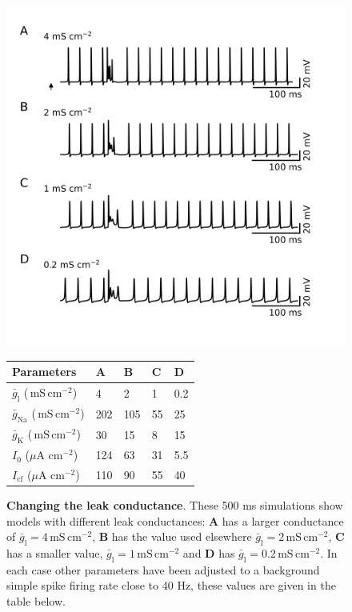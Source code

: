 \documentclass[twocolumn]{svjour3}          %
\newcommand{\msi}{\,\mathrm{mS\,cm^{-2}}}
\renewcommand{\k}{\mathrm{K}}
\newcommand{\na}{\mathrm{Na}}
\newcommand{\leak}{\mathrm{l}}
\begin{document}
\begin{figure}[!ht]
\includegraphics[width=\linewidth]{figure_gl_3.jpg}
\caption{\textbf{Changing the leak conductance}. These 500 ms simulations show models
  with different leak conductances: \textbf{A} has a larger
  conductance of $\bar{g}_\leak=4\msi$, \textbf{B} has the value used
  elsewhere $\bar{g}_\leak=2\msi$, \textbf{C} has a smaller value,
  $\bar{g}_\leak=1\msi$ and \textbf{D} has $\bar{g}_\leak=0.2\msi$. In
  each case other parameters have been adjusted to a background simple
  spike firing rate close to 40 Hz, these values are given in the
  table below.}
  \begin{center}
    \begin{tabular}{|l l l l l|}
      \hline
      Parameters &  \textbf{A} & \textbf{B} & \textbf{C} & \textbf{D}\\ \hline
      $\bar{g}_{\mathrm{l}}$ ($\msi$)& 4& 2&1&0.2\\
        $\bar{g}_\na$ ($\msi$)&202&105&55&25\\
        $\bar{g}_\k$ ($\msi$)&30&15&8&15\\
      $I_0$ ($\mu$A cm$^{-2}$)  &124         &63&31&5.5\\
      $I_{\mathrm{cf}}$ ($\mu$A cm$^{-2}$) &110&90&55&40\\
      \hline
    \end{tabular}
    \end{center}
\label{Fig_gl_3}
\end{figure}
\end{document}
